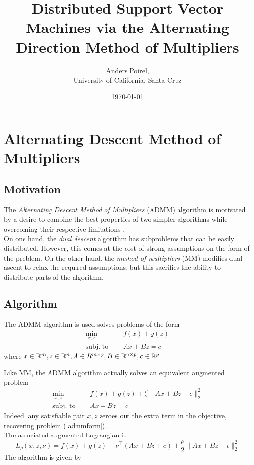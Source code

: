 \documentclass[11pt]{article}
\author{Anders Poirel, \\ University of California, Santa Cruz}
\date{\today}
\title{
    Distributed Support Vector Machines via the Alternating Direction Method of Multipliers
}
\begin{document}
\maketitle 

\section{Alternating Descent Method of Multipliers}

\subsection{Motivation}

The \emph{Alternating Descent Method of Multipliers} (ADMM) algorithm is motivated by a 
desire to combine the best properties of two simpler algorithms while overcoming 
their respective limitations \cite{boydistributed}. \\
On one hand, the \emph{dual descent} algorithm has subproblems that can be easily distributed. 
However, this comes at the cost of strong assumptions on the form of the problem. 
On the other hand, the \emph{method of multipliers} (MM) modifies dual ascent to relax the required assumptions, but this sacrifies the ability to distribute parts of the algorithm. 

\subsection{Algorithm}

The ADMM algorithm is used solves problems of the form
\begin{equation} \label{admmform}
\begin{aligned}
    \min_{x, z} \quad & f(x) + g(z) \\
    \textrm{subj. to } \quad & Ax + Bz = c
\end{aligned}
\end{equation}
where $x \in \mathbb{R}^m, z \in \mathbb{R}^n, A \in R^{m \times p}, B \in \mathbb{R}^{n \times p}, c \in \mathbb{R}^p$

Like MM, the ADMM algorithm actually solves an equivalent augmented problem 
\begin{equation} \label{admm_aug_form}
    \begin{aligned}
        \min_{x, z} \quad & f(x) + g(z) + \frac{\rho}{2} \|Ax + Bz - c\|_2^2\\
        \textrm{subj. to } \quad & Ax + Bz = c
    \end{aligned}
    \end{equation}
Indeed, any satisfiable pair $x,z$ zeroes out the extra term in the objective, 
recovering problem (\ref{admmform}). \\
The associated augmented Lagrangian is
\[
    L_{\rho}(x,z,\nu) =  f(x) + g(z) + \nu^\top(Ax+Bz+c) + \frac{\rho}{2} \|Ax + Bz - c\|_2^2
\]
The algorithm is given by  \\
\end{document}
